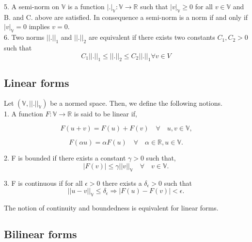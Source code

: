 \documentclass[a4paper,twoside,openright]{book}
\begin{document}
\begin{appendices}
5. A semi-norm on $\mathbb{V}$ is a function $|.|_\mathbb{V} : \mathbb{V} \rightarrow \mathbb{R}$ such that $|v|_\mathbb{V} \geq 0$ for all $v \in \mathbb{V}$ and B. and C. above are satisfied. In consequence a semi-norm is a norm if and only if $|v|_\mathbb{V} = 0$ implies  $v = 0$.\\

6. Two norms $||.||_1$ and $||.||_2$ are equivalent if there exists two constants $C_1,C_2 > 0$ such that \\

\begin{equation} \label{norm_equivalent}
C_1||.||_1 \leq ||.||_2 \leq C_2 ||.||_1 \forall v \in V
\end{equation}

\subsection{Linear forms}

Let $(\mathbb{V,||.||_\mathbb{V}})$ be a normed space. Then, we define the following notions.\\

1. A function $F : \mathbb{V} \rightarrow \mathbb{R}$ is said to be linear if,

\begin{equation} 
F(u+v) = F(u) + F(v) \quad \forall \quad u,v \in \mathbb{V} \textrm{,}
\end{equation}

\begin{equation} 
F(\alpha u) = \alpha F(u) \quad \forall \quad \alpha \in \mathbb{R}, u \in \mathbb{V} \textrm{.}
\end{equation}

2. F is bounded if there exists a constant $\gamma > 0$ such that,
\begin{equation} 
|F(v)| \leq \gamma ||v||_\mathbb{V} \quad \forall \quad v \in \mathbb{V} \textrm{.}
\end{equation}

3. F is continuous if for all $\epsilon > 0$ there exists a $\delta_\epsilon > 0$ such that \\
\begin{equation}
||u - v||_\mathbb{V} \leq \delta_\epsilon \Rightarrow  |F(u) - F(v)| < \epsilon \textrm{.}
\end{equation}

The notion of continuity and boundedness is equivalent for linear forms.

\subsection{Bilinear forms}


\end{appendices}
\end{document}
